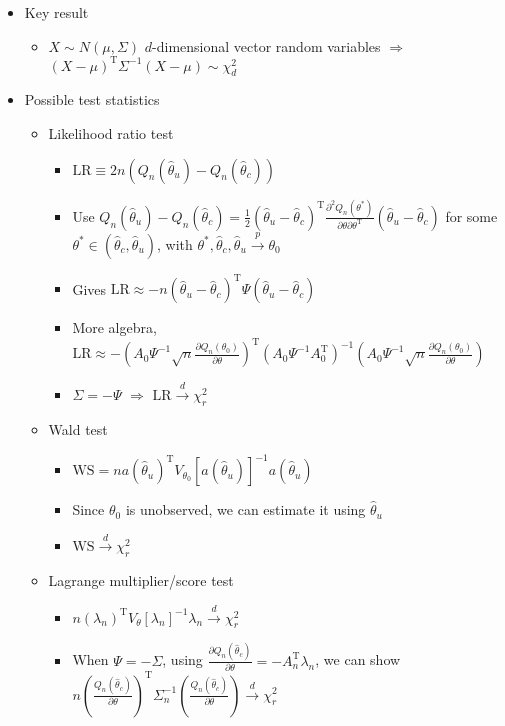 \documentclass[12pt,english]{article}
\newcommand{\T}{\ensuremath{\text{T}}}
\begin{document}
\begin{itemize}
\begin{itemize}
	\end{itemize}
	\item Key result
	\begin{itemize}
		\item $X \sim N(\mu, \Sigma)$ $d$-dimensional vector random variables $\Rightarrow$ $(X - \mu)^{\T} \Sigma^{-1} (X - \mu) \sim \chi^{2}_{d}$
	\end{itemize}
	\item Possible test statistics
	\begin{itemize}
		\item Likelihood ratio test
		\begin{itemize}
			\item $\text{LR} \equiv 2n (Q_{n}(\hat{\theta}_{u}) - Q_{n}(\hat{\theta}_{c}))$
			\item Use $Q_{n}(\hat{\theta}_{u}) - Q_{n}(\hat{\theta}_{c}) = \frac{1}{2} (\hat{\theta}_{u} - \hat{\theta}_{c})^{\T} \frac{\partial^{2} Q_{n}(\theta^{*})}{\partial \theta \partial \theta^{\T}} (\hat{\theta}_{u} - \hat{\theta}_{c})$ for some $\theta^{*} \in \left( \hat{\theta}_{c}, \hat{\theta}_{u} \right)$, with $\theta^{*}, \hat{\theta}_{c}, \hat{\theta}_{u} \overset{p}{\to} \theta_{0}$
			\item Gives $\text{LR} \approx -n (\hat{\theta}_{u} - \hat{\theta}_{c})^{\T} \Psi (\hat{\theta}_{u} - \hat{\theta}_{c})$
			\item More algebra, $\text{LR} \approx -(A_{0} \Psi^{-1} \sqrt{n} \frac{\partial Q_{n}(\theta_{0})}{\partial \theta})^{\T} (A_{0} \Psi^{-1} A_{0}^{\T})^{-1} (A_{0} \Psi^{-1} \sqrt{n} \frac{\partial Q_{n}(\theta_{0})}{\partial \theta})$
			\item $\Sigma = -\Psi$ $\Rightarrow$ $\text{LR} \overset{d}{\to} \chi^{2}_{r}$
		\end{itemize}
		\item Wald test
		\begin{itemize}
			\item $ \text{WS} = n a(\hat{\theta}_{u})^{\T} V_{\theta_{0}}[a(\hat{\theta}_{u})]^{-1} a(\hat{\theta}_{u})$
			\item Since $\theta_{0}$ is unobserved, we can estimate it using $\hat{\theta}_{u}$
			\item $ \text{WS} \overset{d}{\to} \chi^{2}_{r}$
		\end{itemize}
		\item Lagrange multiplier/score test
		\begin{itemize}
			\item $ n (\lambda_{n})^{\T} V_{\theta}[\lambda_{n}]^{-1} \lambda_{n} \overset{d}{\to} \chi^{2}_{r}$
			\item When $\Psi = -\Sigma$, using $ \frac{\partial Q_{n}(\hat{\theta}_{c})}{\partial \theta} = -A_{n}^{\T} \lambda_{n}$, we can show $n (\frac{Q_{n}(\hat{\theta}_{c})}{\partial \theta})^{\T} \Sigma_{n}^{-1} (\frac{Q_{n}(\hat{\theta}_{c})}{\partial \theta}) \overset{d}{\to} \chi^{2}_{r} $
		\end{itemize}
	\end{itemize}
\end{itemize}
\end{document}
